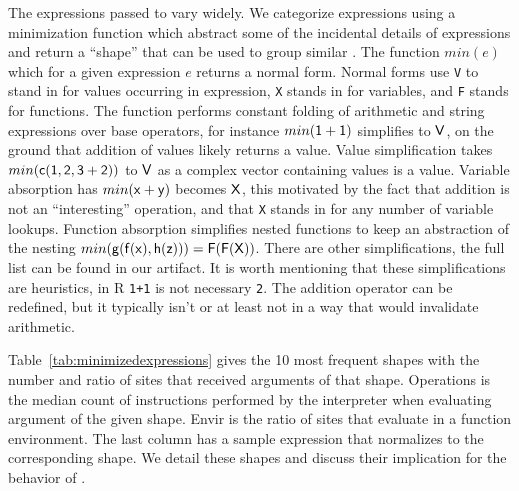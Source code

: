 \documentclass[screen,acmsmall]{acmart}%
\renewcommand{\k}[1]{\lstinline |#1|\xspace}
\begin{document}
The expressions passed to \eval vary widely. We categorize expressions using a
minimization function which abstract some of the incidental details of
expressions and return a ``shape'' that can be used to group similar \evals. The
function $min(e)$ which for a given expression $e$ returns a normal form. Normal
forms use \k{V} to stand in for values occurring in expression, \k{X} stands in
for variables, and \k{F} stands for functions. The function performs constant
folding of arithmetic and string expressions over base operators, for instance
$min({\sf 1+1})$ simplifies to ${\sf V}$, on the ground that addition of values
likely returns a value. Value simplification takes $min({\sf c(1,2,3+2)})$ to
${\sf V}$ as a complex vector containing values is a value. Variable absorption
has $min({\sf x+y})$ becomes ${\sf X}$, this motivated by the fact that addition is
not an ``interesting'' operation, and that \k{X} stands in for any number of
variable lookups. Function absorption simplifies nested functions to keep an
abstraction of the nesting $min({\sf g(f(x),h(z))})={\sf F(F(X))}$. There are other
simplifications, the full list can be found in our artifact. It is worth
mentioning that these simplifications are heuristics, in R \k{1+1} is not
necessary \k{2}. The addition operator can be redefined, but it typically isn't
or at least not in a way that would invalidate arithmetic.

Table~\ref{tab:minimizedexpressions} gives the 10 most frequent shapes with the
number and ratio of sites that received arguments of that shape. Operations is
the median count of instructions performed by the interpreter when evaluating
argument of the given shape. Envir is the ratio of sites that evaluate in a
function environment. The last column has a sample expression that normalizes to
the corresponding shape. We detail these shapes and discuss their implication for
the behavior of \eval.

\newcommand{\EE}[1]{{{\emph{\framebox{#1}}}}\\[1mm]}
\end{document}
